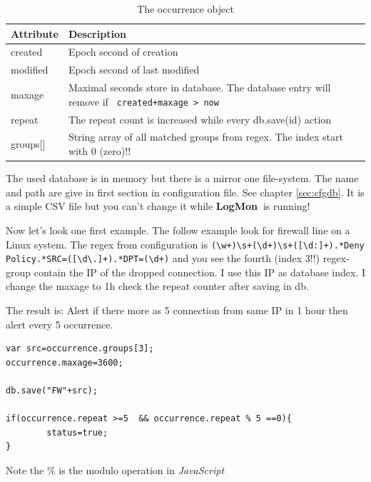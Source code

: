 \documentclass[11pt,a4paper]{article}
\newcommand{\logmon}{\textbf{LogMon\ }}
\newcommand{\js}{\textit{JavaScript\ }}
\begin{document}
\begin{table}[ht]
\begin{tabular}{l|p{}}
  Attribute & Description\\\hline\hline
  created   & Epoch second of creation\\\hline
  modified  & Epoch second of last modified\\\hline

  maxage    & Maximal seconds store in database. The database entry will remove
  if \verb# created+maxage > now#\\\hline

  repeat    & The repeat count is increased while every db.save(id)
  action\\\hline

  groups[]  & String array of all matched groups from regex. The index start
  with 0 (zero)!!\\\hline
\end{tabular}
\caption{The occurrence object}
\label{tab:occurr}
\end{table}

The used database is in memory but there is a mirror one file-system. The name and path are give in first
section in configuration file. See chapter \ref{sec:cfgdb}. It is a simple CSV file but you can't change
it while \logmon is running!

Now let's look one first example. The follow example look for firewall line on a
Linux system. The regex from configuration is
\verb#(\w+)\s+(\d+)\s+([\d:]+).*Deny Policy.*SRC=([\d\.]+).*DPT=(\d+)# and you
see the fourth (index 3!!) regex-group contain the IP of the dropped connection.
I use this IP as database index. I change the maxage to 1h check the repeat
counter after saving in db.

The result is: Alert if there more as 5 connection
from same IP in 1 hour then alert every 5 occurrence.

\begin{samepage}
\begin{verbatim}
var src=occurrence.groups[3];
occurrence.maxage=3600;

db.save("FW"+src);

if(occurrence.repeat >=5  && occurrence.repeat % 5 ==0){
        status=true;
}
\end{verbatim}
\end{samepage}

Note the \% is the modulo operation in \js

\end{document}
